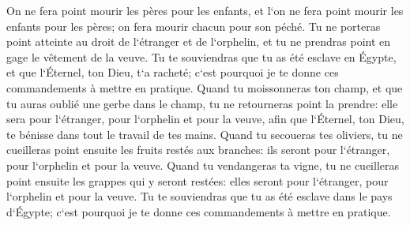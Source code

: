 \verse On ne fera point mourir les pères pour les enfants, et l`on ne fera point mourir les enfants pour les pères; on fera mourir chacun pour son péché. 
\verse Tu ne porteras point atteinte au droit de l`étranger et de l`orphelin, et tu ne prendras point en gage le vêtement de la veuve. 
\verse Tu te souviendras que tu as été esclave en Égypte, et que l`Éternel, ton Dieu, t`a racheté; c`est pourquoi je te donne ces commandements à mettre en pratique. 
\verse Quand tu moissonneras ton champ, et que tu auras oublié une gerbe dans le champ, tu ne retourneras point la prendre: elle sera pour l`étranger, pour l`orphelin et pour la veuve, afin que l`Éternel, ton Dieu, te bénisse dans tout le travail de tes mains. 
\verse Quand tu secoueras tes oliviers, tu ne cueilleras point ensuite les fruits restés aux branches: ils seront pour l`étranger, pour l`orphelin et pour la veuve. 
\verse Quand tu vendangeras ta vigne, tu ne cueilleras point ensuite les grappes qui y seront restées: elles seront pour l`étranger, pour l`orphelin et pour la veuve. 
\verse Tu te souviendras que tu as été esclave dans le pays d`Égypte; c`est pourquoi je te donne ces commandements à mettre en pratique. 

